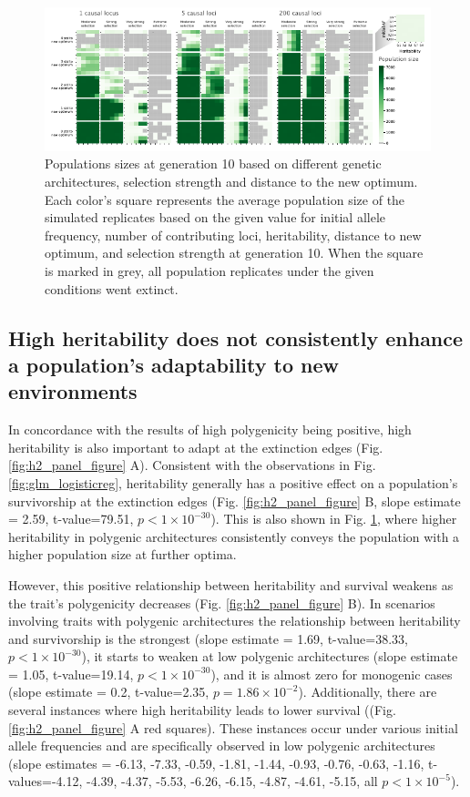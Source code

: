\documentclass{article}
\begin{document}
\begin{figure}[H]
  \centering
  \includegraphics[width=1\textwidth]{figures/pop_size_GEN10.pdf}
  \caption{Populations sizes at generation 10 based on different genetic architectures, selection strength and distance to the new optimum. Each color's square represents the average population size of the simulated replicates based on the given value for initial allele frequency, number of contributing loci, heritability, distance to new optimum, and selection strength at generation 10. When the square is marked in grey, all population replicates under the given conditions went extinct.}
  \label{fig:pop_size_poly_gen10}
\end{figure}

\subsection{High heritability does not consistently enhance a population’s adaptability to new environments}
In concordance with the results of high polygenicity being positive, high heritability is also important to adapt at the extinction edges (Fig. \ref{fig:h2_panel_figure} A). Consistent with the observations in Fig. \ref{fig:glm_logisticreg}, heritability generally has a positive effect on a population's survivorship at the extinction edges (Fig. \ref{fig:h2_panel_figure} B, slope estimate = 2.59, t-value=79.51, $p<1 \times 10^{-30}$). This is also shown in Fig. \ref{fig:pop_size_poly_gen10}, where higher heritability in polygenic architectures consistently conveys the population with a higher population size at further optima.

However, this positive relationship between heritability and survival weakens as the trait's polygenicity decreases (Fig. \ref{fig:h2_panel_figure} B). In scenarios involving traits with polygenic architectures the relationship between heritability and survivorship is the strongest (slope estimate = 1.69, t-value=38.33, $p<1 \times 10^{-30}$), it starts to weaken at low polygenic architectures (slope estimate = 1.05, t-value=19.14, $p<1 \times 10^{-30}$), and it is almost zero for monogenic cases (slope estimate = 0.2, t-value=2.35, $p=1.86 \times 10^{-2}$). Additionally, there are several instances where high heritability leads to lower survival ((Fig. \ref{fig:h2_panel_figure} A red squares). These instances occur under various initial allele frequencies and are specifically observed in low polygenic architectures (slope estimates = -6.13, -7.33, -0.59, -1.81, -1.44, -0.93, -0.76, -0.63, -1.16, t-values=-4.12, -4.39, -4.37, -5.53, -6.26, -6.15, -4.87, -4.61, -5.15, all $p<1 \times 10^{-5}$).
\end{document}
